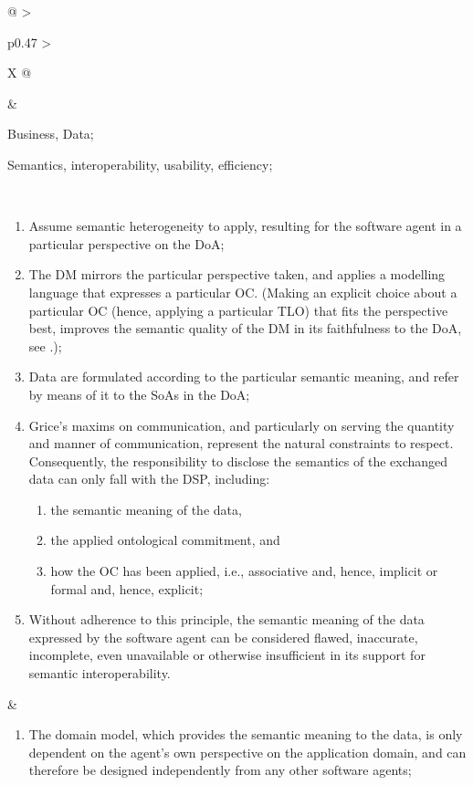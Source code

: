 \begin{xltabular}[l]{\linewidth}{@{} >{\small\raggedright\arraybackslash}p{0.47\linewidth} >{\small\raggedright\arraybackslash}X @{}}
\begin{mmdp}
\end{mmdp}
&
\begin{description}[labelwidth=3.7cm,leftmargin=3.7cm+1ex,nosep,topsep=2ex,labelsep=1ex,font=\bfseries]
  \item[Type of information:] Business, Data;
  \item[Quality attributes:] Semantics, interoperability, usability, efficiency;
\end{description} \\
\begin{enumerate}[left=6pt, nosep]
  \item Assume semantic heterogeneity to apply, resulting for the software agent in a particular perspective on the DoA;
  \item The DM mirrors the particular perspective taken, and applies a modelling language that expresses a particular OC. (Making an explicit choice about a particular OC (hence, applying a particular TLO) that fits the perspective best, improves the semantic quality of the DM in its faithfulness to the DoA, see \cite[DP6]{Brandt2021a}.); 
  \item Data are formulated according to the particular semantic meaning, and refer by means of it to the SoAs in the DoA;
  \item Grice’s maxims on communication, and particularly on serving the quantity and manner of communication, represent the natural constraints to respect. Consequently, the responsibility to disclose the semantics of the exchanged data can only fall with the DSP, including:
  \begin{enumerate}
    \item the semantic meaning of the data,
    \item the applied ontological commitment, and
    \item how the OC has been applied, i.e., associative and, hence, implicit or formal and, hence, explicit;
  \end{enumerate}
  \item Without adherence to this principle, the semantic meaning of the data expressed by the software agent can be considered flawed, inaccurate, incomplete, even unavailable or otherwise insufficient in its support for semantic interoperability.
\end{enumerate}
&
\begin{enumerate}[left=10pt, nosep]
  \item The domain model, which provides the semantic meaning to the data, is only dependent on the agent's own perspective on the application domain, and can therefore be designed independently from any other software agents;

\end{enumerate}
\end{xltabular}
